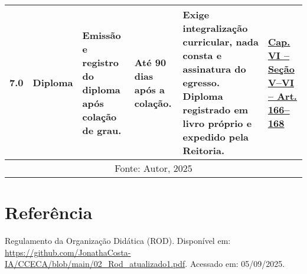 \documentclass[authoryear]{elsarticle}
\begin{document}
\begin{longtable}{|c|p{3cm}|p{3cm}|p{3.5cm}|p{3.5cm}|p{2cm}|}
7.0 & Diploma & Emissão e registro do diploma após colação de grau. & Até 90 dias após a colação. & Exige integralização curricular, nada consta e assinatura do egresso. Diploma registrado em livro próprio e expedido pela Reitoria. & \href{https://github.com/JonathaCosta-IA/CCECA/blob/main/02_Rod_atualizado1.pdf}{Cap. VI – Seção V--VI – Art. 166--168} \\
		\hline
		
		
		
	\multicolumn{6}{c}{\scriptsize Fonte: Autor, 2025} \\
\end{longtable}

		
	\section*{Referência}
	Regulamento da Organização Didática (ROD). Disponível em: 
	\url{https://github.com/JonathaCosta-IA/CCECA/blob/main/02_Rod_atualizado1.pdf}. Acessado em: 05/09/2025.
	
\end{document}
